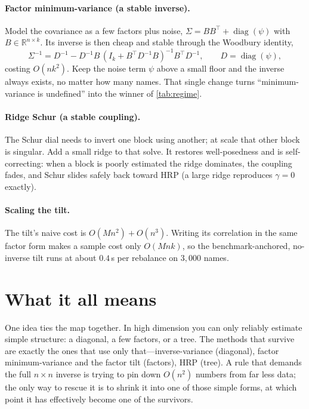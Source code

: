 \documentclass[11pt]{article}
\newcommand{\Sig}{\Sigma}
\newcommand{\R}{\mathbb{R}}
\DeclareMathOperator{\diag}{diag}
\begin{document}
\paragraph{Factor minimum-variance (a stable inverse).}
Model the covariance as a few factors plus noise, $\Sig = BB^\top + \diag(\psi)$
with $B\in\R^{n\times k}$. Its inverse is then cheap and stable through the
Woodbury identity,
\begin{equation}
  \Sig^{-1} = D^{-1} - D^{-1}B\,(I_k + B^\top D^{-1}B)^{-1}B^\top D^{-1},
  \qquad D=\diag(\psi),
\end{equation}
costing $O(nk^2)$. Keep the noise term $\psi$ above a small floor and the inverse
always exists, no matter how many names. That single change turns
``minimum-variance is undefined'' into the winner of \cref{tab:regime}.

\paragraph{Ridge Schur (a stable coupling).}
The Schur dial needs to invert one block using another; at scale that other block
is singular. Add a small ridge to that solve. It restores well-posedness and is
self-correcting: when a block is poorly estimated the ridge dominates, the
coupling fades, and Schur slides safely back toward HRP (a large ridge reproduces
$\gamma{=}0$ exactly).

\paragraph{Scaling the tilt.}
The tilt's naive cost is $O(Mn^2)+O(n^3)$. Writing its correlation in the same
factor form makes a sample cost only $O(Mnk)$, so the benchmark-anchored,
no-inverse tilt runs at about $0.4$\,s per rebalance on $3{,}000$ names.

\section{What it all means}
One idea ties the map together. In high dimension you can only reliably estimate
simple structure: a diagonal, a few factors, or a tree. The methods that
survive are exactly the ones that use only that---inverse-variance (diagonal),
factor minimum-variance and the factor tilt (factors), HRP (tree). A rule that
demands the full $n\times n$ inverse is trying to pin down $O(n^2)$ numbers from
far less data; the only way to rescue it is to shrink it into one of those
simple forms, at which point it has effectively become one of the survivors.
\end{document}
